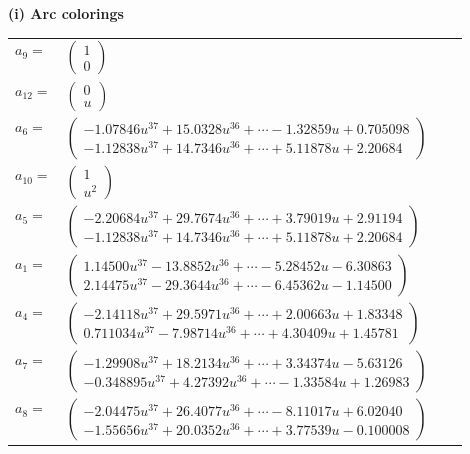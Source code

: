 \documentclass[1p]{elsarticle_modified}
\theoremstyle{definition}
\begin{document}
\flushleft \textbf{(i) Arc colorings}\\
\begin{tabular}{m{7pt} m{180pt} m{7pt} m{180pt} }
\flushright $a_{9}=$&$\begin{pmatrix}1\\0\end{pmatrix}$ \\
\flushright $a_{12}=$&$\begin{pmatrix}0\\u\end{pmatrix}$ \\
\flushright $a_{6}=$&$\begin{pmatrix}-1.07846 u^{37}+15.0328 u^{36}+\cdots-1.32859 u+0.705098\\-1.12838 u^{37}+14.7346 u^{36}+\cdots+5.11878 u+2.20684\end{pmatrix}$ \\
\flushright $a_{10}=$&$\begin{pmatrix}1\\u^2\end{pmatrix}$ \\
\flushright $a_{5}=$&$\begin{pmatrix}-2.20684 u^{37}+29.7674 u^{36}+\cdots+3.79019 u+2.91194\\-1.12838 u^{37}+14.7346 u^{36}+\cdots+5.11878 u+2.20684\end{pmatrix}$ \\
\flushright $a_{1}=$&$\begin{pmatrix}1.14500 u^{37}-13.8852 u^{36}+\cdots-5.28452 u-6.30863\\2.14475 u^{37}-29.3644 u^{36}+\cdots-6.45362 u-1.14500\end{pmatrix}$ \\
\flushright $a_{4}=$&$\begin{pmatrix}-2.14118 u^{37}+29.5971 u^{36}+\cdots+2.00663 u+1.83348\\0.711034 u^{37}-7.98714 u^{36}+\cdots+4.30409 u+1.45781\end{pmatrix}$ \\
\flushright $a_{7}=$&$\begin{pmatrix}-1.29908 u^{37}+18.2134 u^{36}+\cdots+3.34374 u-5.63126\\-0.348895 u^{37}+4.27392 u^{36}+\cdots-1.33584 u+1.26983\end{pmatrix}$ \\
\flushright $a_{8}=$&$\begin{pmatrix}-2.04475 u^{37}+26.4077 u^{36}+\cdots-8.11017 u+6.02040\\-1.55656 u^{37}+20.0352 u^{36}+\cdots+3.77539 u-0.100008\end{pmatrix}$ \\

\end{tabular}
\end{document}
